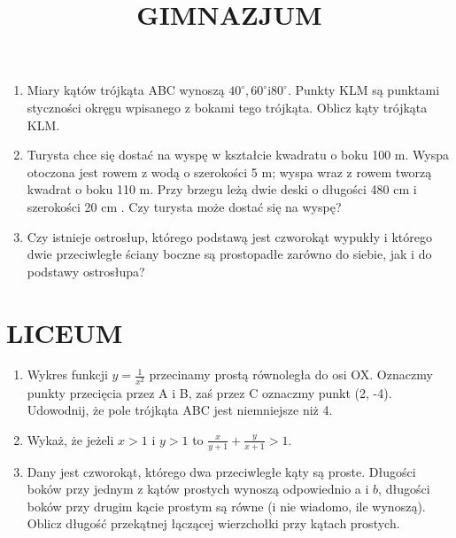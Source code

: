 \documentclass[10pt]{article}
\title{GIMNAZJUM }
\author{}
\date{}
\begin{document}
\maketitle
\begin{enumerate}
  \item Miary kątów trójkąta ABC wynoszą \(40^{\circ}, 60^{\circ} \mathrm{i} 80^{\circ}\). Punkty KLM są punktami styczności okręgu wpisanego z bokami tego trójkąta. Oblicz kąty trójkąta KLM.
  \item Turysta chce się dostać na wyspę w kształcie kwadratu o boku 100 m. Wyspa otoczona jest rowem z wodą o szerokości 5 m; wyspa wraz z rowem tworzą kwadrat o boku 110 m. Przy brzegu leżą dwie deski o długości 480 cm i szerokości 20 cm . Czy turysta może dostać się na wyspę?
  \item Czy istnieje ostrosłup, którego podstawą jest czworokąt wypukły i którego dwie przeciwległe ściany boczne są prostopadłe zarówno do siebie, jak i do podstawy ostrosłupa?
\end{enumerate}

\section*{LICEUM}
\begin{enumerate}
  \item Wykres funkcji \(y=\frac{1}{x^{2}}\) przecinamy prostą równoległa do osi OX. Oznaczmy punkty przecięcia przez A i B, zaś przez C oznaczmy punkt (2, -4). Udowodnij, że pole trójkąta ABC jest niemniejsze niż 4.
  \item Wykaż, że jeżeli \(x>1\) i \(y>1\) to \(\frac{x}{y+1}+\frac{y}{x+1}>1\).
  \item Dany jest czworokąt, którego dwa przeciwległe kąty są proste. Długości boków przy jednym z kątów prostych wynoszą odpowiednio a i \(b\), długości boków przy drugim kącie prostym są równe (i nie wiadomo, ile wynoszą). Oblicz długość przekątnej łączącej wierzchołki przy kątach prostych.
\end{enumerate}
\end{document}
